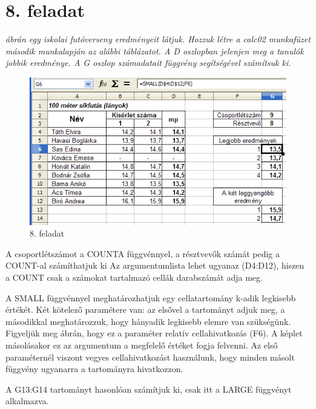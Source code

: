 \section{8. feladat}

{\itshape
{} ábrán egy iskolai futóverseny eredményeit látjuk. Hozzuk
létre a calc02 munkafüzet második munkalapján az alábbi
táblázatot. A D oszlopban jelenjen meg a tanulók jobbik
eredménye. A G oszlop számadatait függvény segítségével
számítsuk ki.}

\begin{figure}[!h]
\begin{center}
\includegraphics[width=14.125cm]{oocalcv1-img41.png}
\caption{8. feladat}\label{8-feladat}
\end{center}
\end{figure}

A csoportlétszámot a COUNTA függvénnyel, a résztvevők
számát pedig a COUNT-al számíthatjuk ki Az argumentumlista
lehet ugyanaz (D4:D12), hiszen a COUNT csak a számokat tartalmazó
cellák darabszámát adja meg.

A SMALL függvénnyel meghatározhatjuk egy cellatartomány k-adik
legkisebb értékét. Két kötelező paramétere van: az
elsővel a tartományt adjuk meg, a másodikkal meghatározzuk,
hogy hányadik legkisebb elemre van szükségünk. Figyeljük meg
 ábrán, hogy ez a paraméter relatív cellahivatkozás
(F6). A képlet másolásakor ez az argumentum a megfelelő
értéket fogja felvenni. Az első paraméternél viszont vegyes
cellahivatkozást használunk, hogy minden másolt függvény
ugyanarra  a tartományra hivatkozzon.

A G13:G14 tartományt hasonlóan számítjuk ki, csak itt a LARGE
függvényt alkalmazva.

